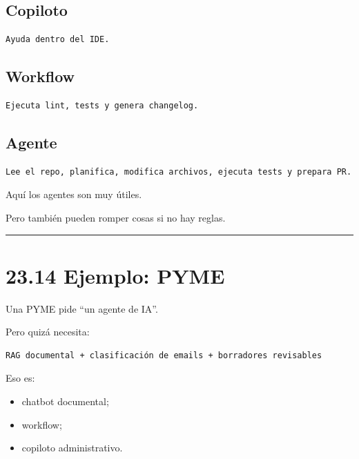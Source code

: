 \subsection{Copiloto}\label{copiloto-3}

\begin{lstlisting}
Ayuda dentro del IDE.
\end{lstlisting}

\subsection{Workflow}\label{workflow-3}

\begin{lstlisting}
Ejecuta lint, tests y genera changelog.
\end{lstlisting}

\subsection{Agente}\label{agente-4}

\begin{lstlisting}
Lee el repo, planifica, modifica archivos, ejecuta tests y prepara PR.
\end{lstlisting}

Aquí los agentes son muy útiles.

Pero también pueden romper cosas si no hay reglas.

\begin{center}\rule{0.5\linewidth}{0.5pt}\end{center}

\section{23.14 Ejemplo: PYME}\label{ejemplo-pyme}

Una PYME pide ``un agente de IA''.

Pero quizá necesita:

\begin{lstlisting}
RAG documental + clasificación de emails + borradores revisables
\end{lstlisting}

Eso es:

\begin{itemize}
\tightlist
\item
  chatbot documental;
\item
  workflow;
\item
  copiloto administrativo.
\end{itemize}

